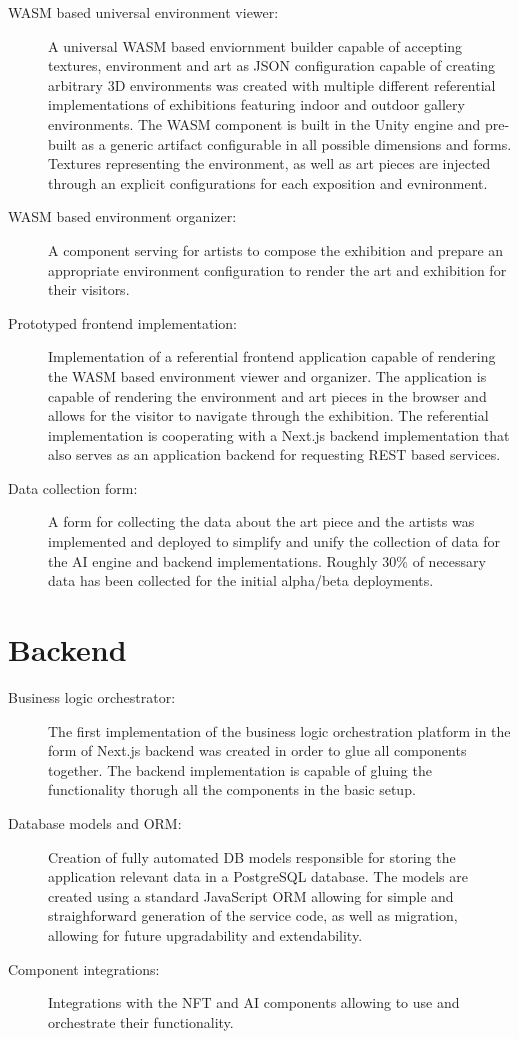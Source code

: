\begin{description}
    \item[WASM based universal environment viewer:] A universal WASM based enviornment builder capable of accepting textures, environment and art as JSON configuration capable of creating arbitrary 3D environments was created with multiple different referential implementations of exhibitions featuring indoor and outdoor gallery environments. The WASM component is built in the Unity engine and pre-built as a generic artifact configurable in all possible dimensions and forms. Textures representing the environment, as well as art pieces are injected through an explicit configurations for each exposition and evnironment.
    \item[WASM based environment organizer:] A component serving for artists to compose the exhibition and prepare an appropriate environment configuration to render the art and exhibition for their visitors.
    \item[Prototyped frontend implementation:] Implementation of a referential frontend application capable of rendering the WASM based environment viewer and organizer. The application is capable of rendering the environment and art pieces in the browser and allows for the visitor to navigate through the exhibition. The referential implementation is cooperating with a Next.js backend implementation that also serves as an application backend for requesting REST based services.
    \item[Data collection form:] A form for collecting the data about the art piece and the artists was implemented and deployed to simplify and unify the collection of data for the AI engine and backend implementations. Roughly 30\% of necessary data has been collected for the initial alpha/beta deployments.
\end{description}
\section{Backend}
\begin{description}
    \item[Business logic orchestrator:] The first implementation of the business logic orchestration platform in the form of Next.js backend was created in order to glue all components together. The backend implementation is capable of gluing the functionality thorugh all the components in the basic setup.
    \item[Database models and ORM:] Creation of fully automated DB models responsible for storing the application relevant data in a PostgreSQL database. The models are created using a standard JavaScript ORM allowing for simple and straighforward generation of the service code, as well as migration, allowing for future upgradability and extendability.
    \item[Component integrations:] Integrations with the NFT and AI components allowing to use and orchestrate their functionality.
\end{description}

